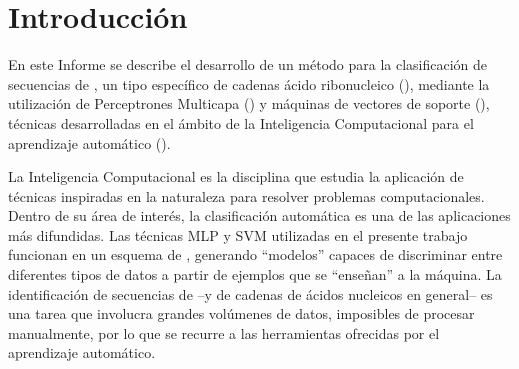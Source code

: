 %
%
%
\chapter{Introducción}
\setcounter{page}{1}
%
En este Informe se describe el desarrollo de un método para la
clasificación de secuencias de \premirna{}, un tipo específico de
cadenas ácido ribonucleico (), mediante la utilización de
Perceptrones Multicapa () y máquinas de vectores de soporte
(), técnicas desarrolladas en el ámbito de la Inteligencia
Computacional para el aprendizaje automático ().

La Inteligencia Computacional es la disciplina que estudia la
aplicación de técnicas inspiradas en la naturaleza para resolver
problemas computacionales.
Dentro de su área de interés, la clasificación automática es una de
las aplicaciones más difundidas.
Las técnicas MLP y SVM utilizadas en el presente trabajo funcionan en
un esquema de , generando ``modelos''
capaces de discriminar entre diferentes tipos de datos a partir de
ejemplos que se ``enseñan'' a la máquina.
La identificación de secuencias de  --y de cadenas de
ácidos nucleicos en general-- es una tarea que involucra grandes
volúmenes de datos, imposibles de procesar manualmente, por lo que se
recurre a las herramientas ofrecidas por el aprendizaje automático.
